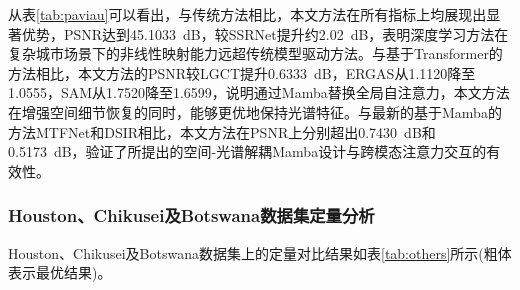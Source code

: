 \documentclass[UTF8,a4paper,11pt]{ctexart}
\begin{document}
从表\ref{tab:paviau}可以看出，与传统方法相比，本文方法在所有指标上均展现出显著优势，PSNR达到45.1033~dB，较SSRNet提升约2.02~dB，表明深度学习方法在复杂城市场景下的非线性映射能力远超传统模型驱动方法。与基于Transformer的方法相比，本文方法的PSNR较LGCT提升0.6333~dB，ERGAS从1.1120降至1.0555，SAM从1.7520降至1.6599，说明通过Mamba替换全局自注意力，本文方法在增强空间细节恢复的同时，能够更优地保持光谱特征。与最新的基于Mamba的方法MTFNet和DSIR相比，本文方法在PSNR上分别超出0.7430~dB和0.5173~dB，验证了所提出的空间-光谱解耦Mamba设计与跨模态注意力交互的有效性。

\subsubsection{Houston、Chikusei及Botswana数据集定量分析}
Houston、Chikusei及Botswana数据集上的定量对比结果如表\ref{tab:others}所示(粗体表示最优结果)。
\end{document}
